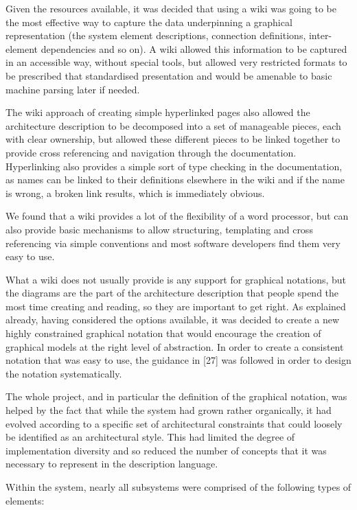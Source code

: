   Given the resources available, it was decided that using a wiki was going to be the most effective way to capture the data underpinning a graphical representation (the system element descriptions, connection definitions, inter-element dependencies and so on).  A wiki allowed this information to be captured in an accessible way, without special tools, but allowed very restricted formats to be prescribed that standardised presentation and would be amenable to basic machine parsing later if needed.

  The wiki approach of creating simple hyperlinked pages also allowed the architecture description to be decomposed into a set of manageable pieces, each with clear ownership, but allowed these different pieces to be linked together to provide cross referencing and navigation through the documentation.  Hyperlinking also provides a simple sort of type checking in the documentation, as names can be linked to their definitions elsewhere in the wiki and if the name is wrong, a broken link results, which is immediately obvious.

  We found that a wiki provides a lot of the flexibility of a word processor, but can also provide basic mechanisms to allow structuring, templating and cross referencing via simple conventions and most software developers find them very easy to use.

  What a wiki does not usually provide is any support for graphical notations, but the diagrams are the part of the architecture description that people spend the most time creating and reading, so they are important to get right.  As explained already, having considered the options available, it was decided to create a new highly constrained graphical notation that would encourage the creation of graphical models at the right level of abstraction.  In order to create a consistent notation that was easy to use, the guidance in [27] was followed in order to design the notation systematically.

  The whole project, and in particular the definition of the graphical notation, was helped by the fact that while the system had grown rather organically, it had evolved according to a specific set of architectural constraints that could loosely be identified as an architectural style.  This had limited the degree of implementation diversity and so reduced the number of concepts that it was necessary to represent in the description language.

  Within the system, nearly all subsystems were comprised of the following types of elements:

